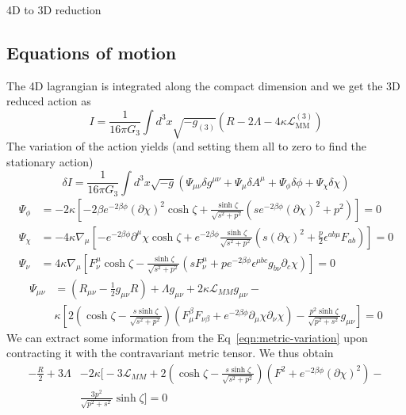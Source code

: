 \begin{frame}[allowframebreaks]{4D to 3D reduction \cite{Dharewa2024}}
\subsection{Equations of motion}
The 4D lagrangian is integrated along the compact dimension and we get the 3D reduced action as  
\begin{equation}
    I = \frac{1}{16\pi G_3}\int d^3x\sqrt{-g_{(3)}} \left(R - 2\Lambda - 4\kappa\mathcal{L}_{\text{MM}}^{(3)}\right)
\end{equation}
The variation of the action yields (and setting them all to zero to find the stationary action) 
\begin{equation}
    \delta I = \frac{1}{16\pi G_3}\int d^3x \sqrt{-g} \left ( \Psi_{\mu\nu}\delta g^{\mu\nu} + \Psi_\mu \delta A^\mu + \Psi_\phi \delta \phi + \Psi_\chi \delta \chi \right) 
\end{equation}
\begin{align}
    \Psi_\phi &= -2\kappa \left [ -2\beta e^{-2\beta\phi} (\partial \chi)^2\cosh\zeta + \frac{\sinh\zeta}{\sqrt{s^2+p^2} } \left ( s e^{-2\beta\phi} (\partial \chi)^2 + p^2\right) \right ] = 0\\ 
    \Psi_\chi &= -4\kappa \nabla_\mu \left [-e^{-2\beta\phi} \partial^\mu \chi \cosh\zeta + e^{-2\beta\phi}\frac{\sinh\zeta}{\sqrt{s^2+p^2} } \left ( s (\partial \chi)^2 + \frac{p}{2}\epsilon^{ab\mu}F_{ab}\right)  \right ] = 0 \\ 
    \Psi_\nu &= 4\kappa \nabla_\mu \left [ F^\mu_\nu\cosh\zeta -  \frac{\sinh\zeta}{\sqrt{s^2+p^2} } \left ( s F^\mu_\nu + p e^{-2\beta\phi}\epsilon^{\mu bc}g_{b\nu}\partial_c\chi\right) \right ] = 0
\end{align}
\begin{align}
    \label{eqn:metric-variation}
    \Psi_{\mu\nu} &= \left ( R_{\mu\nu} - \frac{1}{2}g_{\mu\nu}R \right ) + \Lambda g_{\mu\nu} + 2\kappa \mathcal{L}_{MM}g_{\mu\nu} - \nonumber\\ & \kappa \left [ 2 \left ( \cosh \zeta - \frac{s \sinh \zeta}{\sqrt{s^2+p^2} } \right ) \left ( F^\beta_\mu F_{\nu\beta} + e^{-2\beta\phi}\partial_\mu\chi\partial_\nu\chi \right ) - \frac{p^2\sinh\zeta}{\sqrt{p^2+s^2} }g_{\mu\nu}\right ] = 0
\end{align}
We can extract some information from the Eq~\ref{eqn:metric-variation} upon contracting it with the contravariant metric tensor. We thus obtain 
\begin{align}
    -\frac{R}{2} + 3\Lambda &-2\kappa \Biggl [-3\mathcal{L}_{MM} + 2 \left ( \cosh \zeta - \frac{s \sinh \zeta}{\sqrt{s^2+p^2} } \right ) \left ( F^2 + e^{-2\beta\phi} (\partial \chi)^2\right ) - \nonumber\\ &\frac{3p^2}{\sqrt{p^2+s^2} }\sinh\zeta \Biggl ] = 0
\end{align}


\end{frame}
